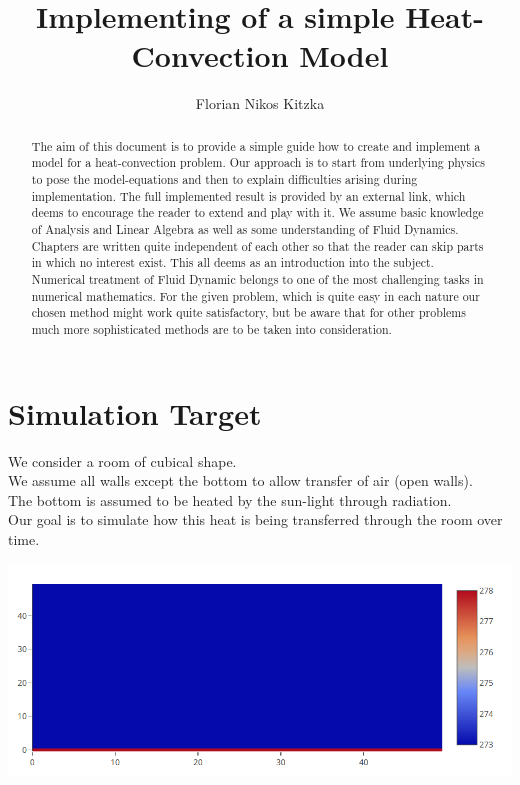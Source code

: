 \documentclass[]{article}
\title{Implementing of a simple Heat-Convection Model}
\author{Florian Nikos Kitzka}
\begin{document}
\maketitle

\begin{abstract}
The aim of this document is to provide a simple guide how to create and implement a model for a heat-convection problem. Our approach is to start from underlying physics to pose the model-equations and then to explain difficulties arising during implementation.
The full implemented result is provided by an external link, which deems to encourage the reader to extend and play with it.
We assume basic knowledge of Analysis and Linear Algebra as well as some understanding of 
Fluid Dynamics. Chapters are written quite independent of each other so that the reader
can skip parts in which no interest exist.
This all deems as an introduction into the subject. Numerical treatment of Fluid Dynamic belongs to one of the most challenging tasks in numerical mathematics.
For the given problem, which is quite easy in each nature our chosen method might work quite satisfactory, but be aware that for other problems much more sophisticated methods are to be taken into consideration.
\end{abstract}

\tableofcontents

\section{Simulation Target}
We consider a room of cubical shape.\\
We assume all walls except the bottom to allow transfer of air (open walls).\\
The bottom is assumed to be heated by the sun-light through radiation.\\
Our goal is to simulate how this heat is being transferred through the room over time.

\includegraphics{setup}
\end{document}
